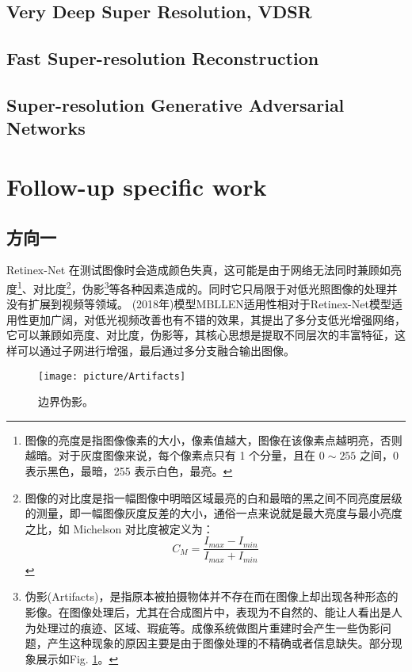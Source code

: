 \documentclass[letterpaper,10pt]{article}
\begin{document}
		\subsection{Very Deep Super Resolution, VDSR}
		
		\subsection{Fast Super-resolution Reconstruction}
		
		\subsection{Super-resolution Generative Adversarial Networks}
		
	
	\section{Follow-up specific work}
	
		\subsection{方向一}
		
		Retinex-Net 在测试图像时会造成颜色失真，这可能是由于网络无法同时兼顾如亮度\footnote{图像的亮度是指图像像素的大小，像素值越大，图像在该像素点越明亮，否则越暗。对于灰度图像来说，每个像素点只有 1 个分量，且在 $0 \sim 255$ 之间，0 表示黑色，最暗，255 表示白色，最亮。}、对比度\footnote{图像的对比度是指一幅图像中明暗区域最亮的白和最暗的黑之间不同亮度层级的测量，即一幅图像灰度反差的大小，通俗一点来说就是最大亮度与最小亮度之比，如 Michelson 对比度被定义为：$$C_M = \frac{I_{max} - I_{min}}{I_{max} + I_{min}}$$}，伪影\footnote{伪影(Artifacts)，是指原本被拍摄物体并不存在而在图像上却出现各种形态的影像。在图像处理后，尤其在合成图片中，表现为不自然的、能让人看出是人为处理过的痕迹、区域、瑕疵等。成像系统做图片重建时会产生一些伪影问题，产生这种现象的原因主要是由于图像处理的不精确或者信息缺失。部分现象展示如Fig. \ref{fig: Ringing Artifacts}。
		
		}等各种因素造成的。同时它只局限于对低光照图像的处理并没有扩展到视频等领域。
		(2018年)模型MBLLEN\cite{Lv2018MBLLEN}适用性相对于Retinex-Net模型适用性更加广阔，对低光视频改善也有不错的效果，其提出了多分支低光增强网络，它可以兼顾如亮度、对比度，伪影等，其核心思想是提取不同层次的丰富特征，这样可以通过子网进行增强，最后通过多分支融合输出图像。
		
		\begin{figure}[htbp]
			\centering 
			\texttt{[image: picture/Artifacts]}
			\caption{
				\label{fig: Ringing Artifacts} 
				边界伪影。
			}
		\end{figure}
		
\end{document}
